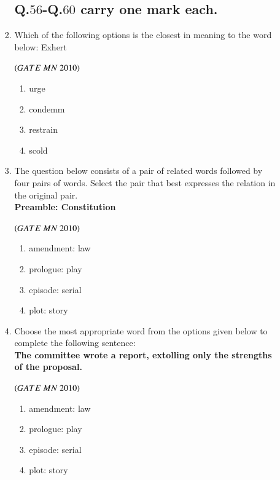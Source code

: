 \documentclass{article}
\begin{document}
\begin{enumerate}[label=Q.\arabic*., itemsep=1em, leftmargin=0pt, itemindent=*, labelsep=0.5em]
\begin{enumerate}[label=Q.\arabic*., start=17, leftmargin=2em]
\begin{enumerate}[label=Q.\arabic*., start=33, leftmargin=2em]
\subsection*{Q.$56$-Q.$60$ carry one mark each.}
\item Which of the following options is the closest in meaning to the word below:
Exhert
\\
\begin{flushright}
\hfill$\left(GATE\ MN\ 2010\right)$
\end{flushright}
\begin{enumerate}[label=(\Alph*),leftmargin=4em]
\item urge
\item condemm
\item restrain
\item scold
\end{enumerate}
\bigskip
\item The question below consists of a pair of related words followed by four pairs of words. Select the
pair that best expresses the relation in the original pair.\\
\textbf{Preamble: Constitution}
\\
\begin{flushright}
\hfill$\left(GATE\ MN\ 2010\right)$
\end{flushright}
\begin{enumerate}[label=(\Alph*),leftmargin=4em]
\item amendment: law
\item prologue: play
\item episode: serial
\item plot: story
\end{enumerate}
\bigskip
\item Choose the most appropriate word from the options given below to complete the following
sentence:\\
\textbf{The committee wrote a \underline{\hspace{1.5cm}} report, extolling only the strengths of the proposal.}
\\
\begin{flushright}
\hfill$\left(GATE\ MN\ 2010\right)$
\end{flushright}
\begin{enumerate}[label=(\Alph*),leftmargin=4em]
\item amendment: law
\item prologue: play
\item episode: serial
\item plot: story

\end{enumerate}
\end{enumerate}
\end{enumerate}
\end{enumerate}
\end{document}
